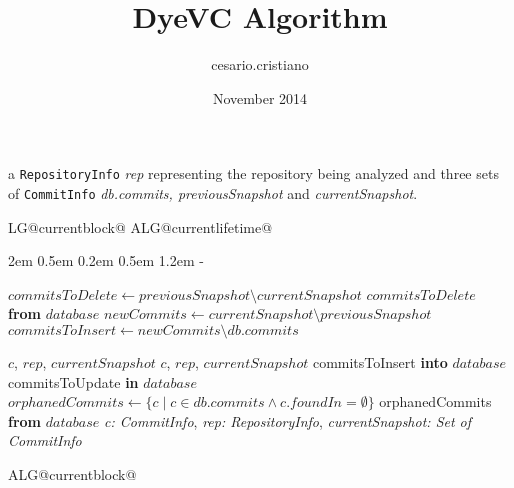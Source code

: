 \documentclass[10pt]{article}
\title{DyeVC Algorithm}
\author{cesario.cristiano }
\date{November 2014}
\makeatletter
\newlength{\continueindent}
\renewenvironment{algorithmic}[1][0]%
   {%
   \edef\ALG@numberfreq{#1}%
   \def\@currentlabel{\theALG@line}%
   \setcounter{ALG@line}{0}%
   \setcounter{ALG@rem}{0}%
   \let\\\algbreak%
   \expandafter\edef\csname ALG@currentblock@\theALG@nested\endcsname{0}%
   \expandafter\let\csname ALG@currentlifetime@\theALG@nested\endcsname\relax%
   \begin{list}%
      {\ALG@step}%
      {%
      \rightmargin\z@%
      \itemsep\z@ \itemindent\z@ \listparindent2em%
      \partopsep\z@ \parskip\z@ \parsep\z@%
      \labelsep 0.5em \topsep 0.2em%
      \ifthenelse{\equal{#1}{0}}%
         {\labelwidth 0.5em}%
         {\labelwidth 1.2em}%
       \leftmargin\labelwidth \addtolength{\leftmargin}{\labelsep}
      \ALG@tlm\z@%
      }%
      \parshape 2 \leftmargin \linewidth \continueindent \dimexpr\linewidth-\continueindent\relax
   \setcounter{ALG@nested}{0}%
   \ALG@beginalgorithmic%
   }%
   {%
   \ALG@closeloops%
   \expandafter\ifnum\csname ALG@currentblock@\theALG@nested\endcsname=0\relax%
   \else%
      \PackageError{algorithmicx}{Some blocks are not closed!!!}{}%
   \fi%
   \ALG@endalgorithmic%
   \end{list}%
   }%
\makeatother
\begin{document}
     a \texttt{RepositoryInfo} {\it rep} representing the 
    repository being analyzed and three sets of \texttt{CommitInfo} {\it db.commits,
    previousSnapshot} and {\it currentSnapshot}.\newline
    
    
    \begin{algorithmic}[1]
        \State $commitsToDelete \gets previousSnapshot \setminus currentSnapshot$
         $commitsToDelete$ {\bf from} $database$
        \State
        \State $newCommits \gets currentSnapshot \setminus previousSnapshot$
        \State $commitsToInsert \gets newCommits \setminus db.commits$
        \State {}
        \State
            \State {} {$c$, $rep$, $currentSnapshot$}
        \EndFor
        \State
            \State {} {$c$, $rep$, $currentSnapshot$}
        \EndFor
        \State
         commitsToInsert {\bf into} $database$
         commitsToUpdate {\bf in} $database$
        \State $orphanedCommits \gets \{c \mid c \in db.commits \wedge c.foundIn =
            \emptyset \}$
         orphanedCommits {\bf from} $database$
        \State
         {{\it c: CommitInfo}, {\it rep: RepositoryInfo},  {\it currentSnapshot: Set of CommitInfo}}
        \State {}
        \State {}
\end{algorithmic}
\end{document}

